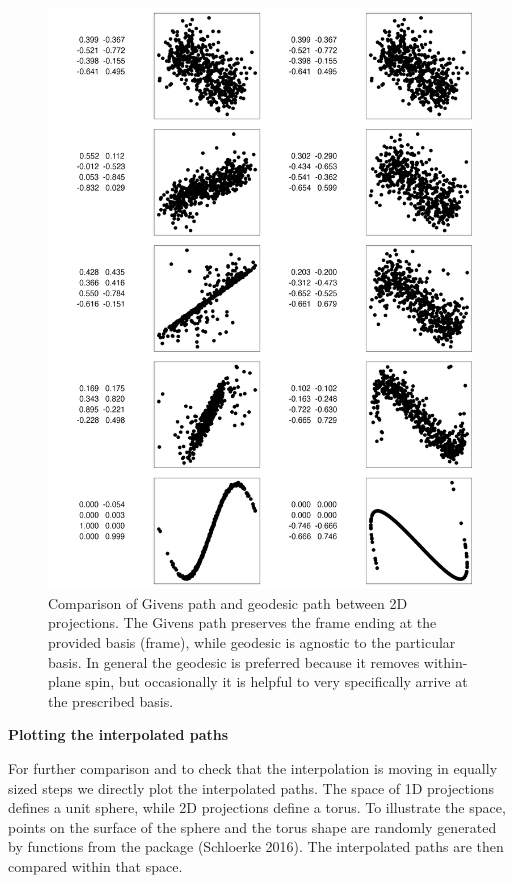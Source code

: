 \begin{figure}

{\centering \includegraphics[width=0.8\linewidth]{compare-paths} 

}

\caption{Comparison of Givens path and geodesic path between 2D projections. The Givens path preserves the frame ending at the provided basis (frame), while geodesic is agnostic to the particular basis. In general the geodesic is preferred because it removes within-plane spin, but occasionally it is helpful to very specifically arrive at the prescribed basis.}\label{fig:compare-paths}
\end{figure}

\textbf{Plotting the interpolated paths}

For further comparison and to check that the interpolation is moving in equally sized steps we directly plot the interpolated paths. The space of 1D projections defines a unit sphere, while 2D projections define a torus. To illustrate the space, points on the surface of the sphere and the torus shape are randomly generated by functions from the  package (Schloerke 2016). The interpolated paths are then compared within that space.

